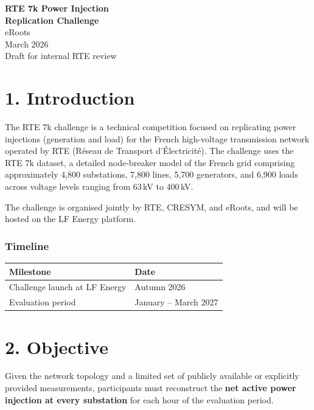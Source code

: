 \documentclass[11pt,a4paper]{article}
\begin{document}
\thispagestyle{empty}
\vspace*{80pt}
\begin{center}
  {\Huge\bfseries RTE 7k Power Injection\\[6pt] Replication Challenge}\\[24pt]
  {\large eRoots}\\[6pt]
  {\large March 2026}\\[12pt]
  {\textcolor{midgrey}{Draft for internal RTE review}}
\end{center}
\newpage

\section{1. Introduction}

The RTE 7k challenge is a technical competition focused on replicating power injections (generation and load) for the French high-voltage transmission network operated by RTE (R\'{e}seau de Transport d'\'{E}lectricit\'{e}). The challenge uses the RTE 7k dataset, a detailed node-breaker model of the French grid comprising approximately 4,800 substations, 7,800 lines, 5,700 generators, and 6,900 loads across voltage levels ranging from 63\,kV to 400\,kV.

The challenge is organised jointly by RTE, CRESYM, and eRoots, and will be hosted on the LF Energy platform.

\subsubsection{Timeline}

\begin{table}[h]
\centering
\begin{tabular}{ll}
\toprule
\textbf{Milestone} & \textbf{Date} \\
\midrule
Challenge launch at LF Energy & Autumn 2026 \\
Evaluation period & January -- March 2027 \\
\bottomrule
\end{tabular}
\end{table}

\section{2. Objective}

Given the network topology and a limited set of publicly available or explicitly provided measurements, participants must reconstruct the \textbf{net active power injection at every substation} for each hour of the evaluation period.
\end{document}
